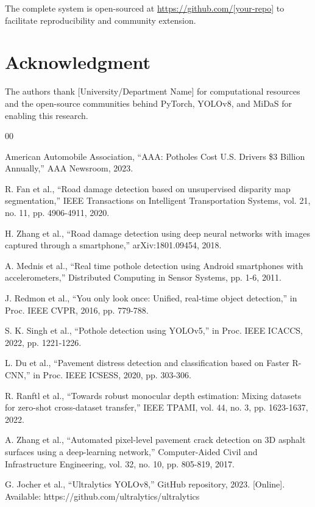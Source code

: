 \documentclass[conference]{IEEEtran}
\begin{document}
The complete system is open-sourced at \url{https://github.com/[your-repo]} to facilitate reproducibility and community extension.

\section*{Acknowledgment}

The authors thank [University/Department Name] for computational resources and the open-source communities behind PyTorch, YOLOv8, and MiDaS for enabling this research.

\begin{thebibliography}{00}

 American Automobile Association, ``AAA: Potholes Cost U.S. Drivers \$3 Billion Annually,'' AAA Newsroom, 2023.

 R. Fan et al., ``Road damage detection based on unsupervised disparity map segmentation,'' IEEE Transactions on Intelligent Transportation Systems, vol. 21, no. 11, pp. 4906-4911, 2020.

 H. Zhang et al., ``Road damage detection using deep neural networks with images captured through a smartphone,'' arXiv:1801.09454, 2018.

 A. Mednis et al., ``Real time pothole detection using Android smartphones with accelerometers,'' Distributed Computing in Sensor Systems, pp. 1-6, 2011.

 J. Redmon et al., ``You only look once: Unified, real-time object detection,'' in Proc. IEEE CVPR, 2016, pp. 779-788.

 S. K. Singh et al., ``Pothole detection using YOLOv5,'' in Proc. IEEE ICACCS, 2022, pp. 1221-1226.

 L. Du et al., ``Pavement distress detection and classification based on Faster R-CNN,'' in Proc. IEEE ICSESS, 2020, pp. 303-306.

 R. Ranftl et al., ``Towards robust monocular depth estimation: Mixing datasets for zero-shot cross-dataset transfer,'' IEEE TPAMI, vol. 44, no. 3, pp. 1623-1637, 2022.

 A. Zhang et al., ``Automated pixel-level pavement crack detection on 3D asphalt surfaces using a deep-learning network,'' Computer-Aided Civil and Infrastructure Engineering, vol. 32, no. 10, pp. 805-819, 2017.

 G. Jocher et al., ``Ultralytics YOLOv8,'' GitHub repository, 2023. [Online]. Available: https://github.com/ultralytics/ultralytics


\end{thebibliography}
\end{document}
